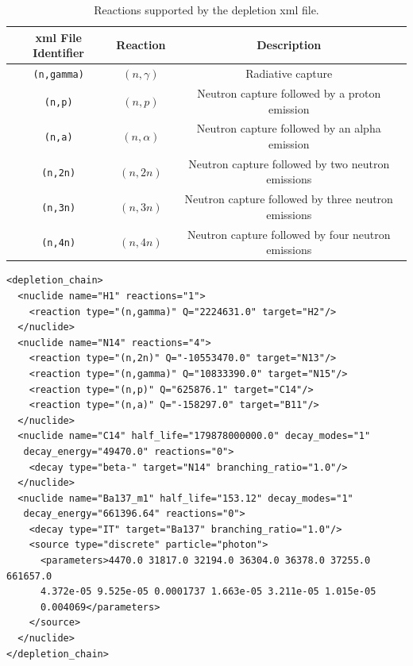 \begin{table}[H]
    \centering
    \caption{Reactions supported by the depletion \acrshort{xml} file.}
    \begin{tabular}{|c|c|c|}
        \hline
        \acrshort{xml} \textbf{File Identifier} & \textbf{Reaction} & \textbf{Description}\\
        \hline
        \texttt{(n,gamma)} & $(n,\gamma)$ & Radiative capture\\
        \texttt{(n,p)} & $(n,p)$ & Neutron capture followed by a proton emission\\
        \texttt{(n,a)} & $(n,\alpha)$ & Neutron capture followed by an alpha emission\\
        \texttt{(n,2n)} & $(n,2n)$ & Neutron capture followed by two neutron emissions\\
        \texttt{(n,3n)} & $(n,3n)$ & Neutron capture followed by three neutron emissions\\
        \texttt{(n,4n)} & $(n,4n)$ & Neutron capture followed by four neutron emissions\\
        \hline
    \end{tabular}
    \label{table:xml_depletion_file_reaction}
\end{table}
\begin{lstlisting}[label={list:depletion_chain}, caption={Example depletion \acrshort{xml} chain file.}]
<depletion_chain>
  <nuclide name="H1" reactions="1">
    <reaction type="(n,gamma)" Q="2224631.0" target="H2"/>
  </nuclide>
  <nuclide name="N14" reactions="4">
    <reaction type="(n,2n)" Q="-10553470.0" target="N13"/>
    <reaction type="(n,gamma)" Q="10833390.0" target="N15"/>
    <reaction type="(n,p)" Q="625876.1" target="C14"/>
    <reaction type="(n,a)" Q="-158297.0" target="B11"/>
  </nuclide>
  <nuclide name="C14" half_life="179878000000.0" decay_modes="1" 
   decay_energy="49470.0" reactions="0">
    <decay type="beta-" target="N14" branching_ratio="1.0"/>
  </nuclide>
  <nuclide name="Ba137_m1" half_life="153.12" decay_modes="1" 
   decay_energy="661396.64" reactions="0">
    <decay type="IT" target="Ba137" branching_ratio="1.0"/>
    <source type="discrete" particle="photon">
      <parameters>4470.0 31817.0 32194.0 36304.0 36378.0 37255.0 661657.0  
      4.372e-05 9.525e-05 0.0001737 1.663e-05 3.211e-05 1.015e-05 
      0.004069</parameters>
    </source>
  </nuclide>
</depletion_chain>
\end{lstlisting}

